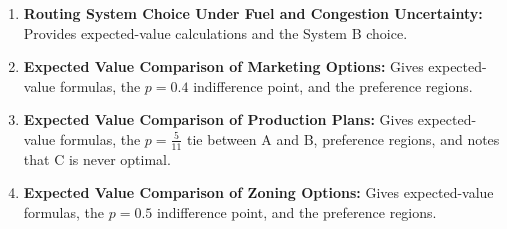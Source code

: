 \begin{enumerate}
\begin{enumerate}
			\item \textbf{Routing System Choice Under Fuel and Congestion Uncertainty:} Provides expected-value calculations and the System B choice.
			\item \textbf{Expected Value Comparison of Marketing Options:} Gives expected-value formulas, the $p=0.4$ indifference point, and the preference regions.
			\item \textbf{Expected Value Comparison of Production Plans:} Gives expected-value formulas, the $p=\frac{5}{11}$ tie between A and B, preference regions, and notes that C is never optimal.
			\item \textbf{Expected Value Comparison of Zoning Options:} Gives expected-value formulas, the $p=0.5$ indifference point, and the preference regions.
		\end{enumerate}
	\end{enumerate}


